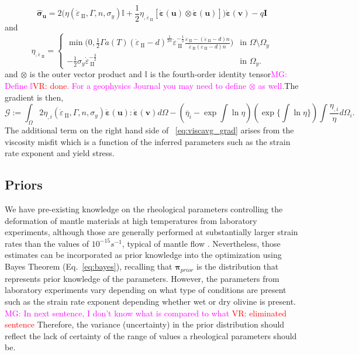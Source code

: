 \documentclass[12pt]{article}
\newcommand{\mgnote}[1]{\textcolor{magenta}{MG: #1}}
\newcommand{\vrnote}[1]{\textcolor{red}{VR: #1}}
\newcommand{\IIinv}{{\dot\varepsilon}_{\mathrm{\!\!\:II}}}
\newcommand{\uu}{{\ensuremath{\boldsymbol{u}}}}
\newcommand{\vv}{{\ensuremath{\boldsymbol{v}}}}
\newcommand{\ppi}{{\ensuremath{\boldsymbol{\pi}}}}
\newcommand{\ssigma}{{\ensuremath{\boldsymbol{\sigma}}}}
\newcommand{\strain}{{\ensuremath{\dot{\boldsymbol{\varepsilon}}}}}
\begin{document}
{\begin{equation}\label{eq:sigma_hat}
\hat\ssigma_\uu  = 2 \Big(\eta(\IIinv,\Gamma, n,
\sigma_y)\mathbb{I}+\frac{1}{2} \eta_{,\IIinv} [\strain(\uu)\otimes
      \strain(\uu)]\Big)\strain(\vv) -q\textbf{I}
\end{equation}
and
\begin{equation}
  \eta_{,\IIinv} \!\!=\!\!
  \begin{cases}
   \min\!\Big(0, \frac{1}{2}\Gamma
   a(T)(\IIinv-d)^{\frac{1}{2n}}\IIinv^{-\frac{1}{2}}\frac{\IIinv-(\IIinv-d)n}{\IIinv(\IIinv-d)n}\Big)
   &\text{in } \Omega\setminus\Omega_y 
   \\
   -\frac{1}{2}\sigma_{y}\IIinv^{-\frac{3}{2}}  &\text{in } \Omega_y.
  \end{cases}
\end{equation}
 and $\otimes$ is the outer vector product and $\mathbb{I}$ is the fourth-order identity tensor\mgnote{Define $\mathbb{I}$\vrnote{done}. For a geophysics Journal you may need to define $\otimes$ as well.}The gradient is then, 
\begin{equation}
\mathcal G:= \int_{\Omega} 2 \eta_{,i}(\IIinv, \Gamma, n, \sigma_y)\strain(\uu):\strain(\vv) d\Omega - (\overline{\eta}_i-\exp\int\ln \eta)(\exp\{\int\ln \eta\})\int\frac{\eta_{,i}}{\eta}d\Omega_i.\
\label{eq:viscavg_grad}
\end{equation}
The additional term on the right hand side of ~\eqref{eq:viscavg_grad} arises from the viscosity misfit which is a function of the inferred parameters such as the strain rate exponent and yield stress.


\subsection*{Priors}
 We have pre-existing knowledge on the rheological parameters controlling the deformation of mantle materials at high temperatures from laboratory experiments\cite{ranalli1995rheology}, 
although those are generally performed at substantially larger strain rates than the values of $10^{-15}s^{-1}$, typical of mantle flow \citep{korenaga2008new}. Nevertheless,  those estimates can be  incorporated as prior knowledge into the optimization using Bayes Theorem (Eq.~\eqref{eq:bayes}), recalling that $\ppi_{prior}$ is the distribution that represents prior knowledge of the parameters. However, the parameters from laboratory experiments vary depending on what type of conditions are present such as the strain rate exponent depending whether wet or dry olivine is present. \mgnote{In next sentence, I don't know what is compared to what} \vrnote{eliminated sentence} Therefore, the variance (uncertainty) in the prior distribution should reflect the lack of certainty of the range of values a rheological parameters should be.

}
\end{document}
